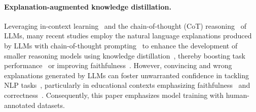 \paragraph{Explanation-augmented knowledge distillation.}
Leveraging in-context learning~\citep{brown2020language} and the chain-of-thought (CoT) reasoning~\citep{chu2023survey} of LLMs, many recent studies employ the natural language explanations produced by LLMs with chain-of-thought prompting~\citep{lampinen-etal-2022-language,li2023symbolic} to enhance the development of smaller reasoning models using knowledge distillation~\citep{zhang2024elad}, thereby boosting task performance~\citep{li2024explanations,ho-etal-2023-large,hsieh-etal-2023-distilling} or improving faithfulness~\citep{wang-etal-2023-scott}.
However, convincing and wrong explanations generated by LLMs can foster unwarranted confidence in tackling NLP tasks~\citep{madsen-etal-2024-self,pruthi-etal-2022-evaluating}, particularly in educational contexts emphasizing faithfulness~\citep{lyu-etal-2024-towards} and correctness~\citep{huang-etal-2024-chatgpt}. Consequently, this paper emphasizes model training with human-annotated datasets.